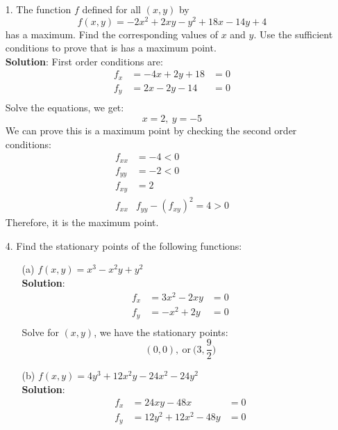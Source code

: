 \documentclass{article}
\begin{document}
\begin{enumerate}
    \item[1. ] The function $f$ defined for all $(x, y)$ by $$f(x, y) = -2x^2 + 2xy - y^2 + 18x - 14y + 4$$ has a maximum. 
    Find the corresponding values of $x$ and $y$. Use the sufficient conditions to prove that is has a maximum point. \\
    
    \textbf{Solution}: First order conditions are:
    \begin{align*}
        f_x &= -4x + 2y + 18 &= 0 \\
        f_y &= 2x - 2y - 14  &= 0 \\
    \end{align*}
    Solve the equations, we get:
    $$ x = 2,\ y = -5 $$
    We can prove this is a maximum point by checking the second order conditions:
    \begin{align*}
        f_{xx} &= -4 < 0 \\
        f_{yy} &= -2 < 0 \\
        f_{xy} &= 2 \\   
        f_{xx} & f_{yy} - (f_{xy})^2 = 4 > 0
    \end{align*}
    Therefore, it is the maximum point. \\
    
    \item[4. ] Find the stationary points of the following functions:
        \begin{enumerate}
            \item[(a)] $ f(x,y) = x^3 - x^2y + y^2 $ \\
            
            \textbf{Solution}:
            \begin{align*}
                f_x &= 3x^2 - 2xy &= 0 \\
                f_y &= -x^2 + 2y  &= 0 \\                
            \end{align*}
            Solve for $(x,y)$, we have the stationary points:
            $$ (0,0),\ \textrm{or}\ \Big( 3, \frac{9}{2}\Big) $$

            \item[(b)] $ f(x,y) = 4y^3 + 12x^2y - 24x^2 - 24y^2 $ \\
            
            \textbf{Solution}:
            \begin{align*}
                f_x &= 24xy - 48x          &= 0 \\
                f_y &= 12y^2 + 12x^2 - 48y &= 0 \\
            \end{align*}
            

\end{enumerate}
\end{enumerate}
\end{document}
